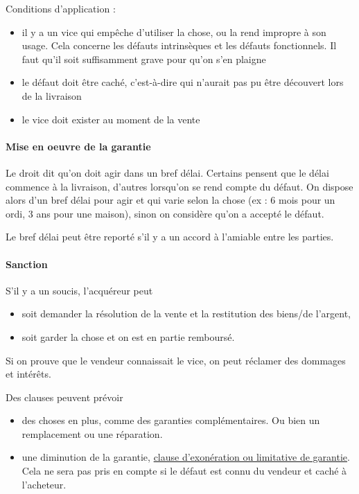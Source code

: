 		Conditions d'application :
		
		\begin{itemize}
			\item il y a un vice qui empêche d'utiliser la chose, ou la rend impropre à son usage. Cela concerne les défauts intrinsèques et les défauts fonctionnels. Il faut qu'il soit suffisamment grave pour qu'on s'en plaigne
			\item le défaut doit être caché, c'est-à-dire qui n'aurait pas pu être découvert lors de la livraison
			\item le vice doit exister au moment de la vente
		\end{itemize}
		
		
			\paragraph{Mise en oeuvre de la garantie}
		
			
			Le droit dit qu'on doit agir dans un bref délai. Certains pensent que le délai commence à la livraison, d'autres lorsqu'on se rend compte du défaut. On dispose alors d'un bref délai pour agir et qui varie selon la chose (ex : 6 mois pour un ordi, 3 ans pour une maison), sinon on considère qu'on a accepté le défaut.
		
			Le bref délai peut être reporté s'il y a un accord à l'amiable entre les parties.
		
			\paragraph{Sanction}
			S'il y a un soucis, l'acquéreur peut
			
			\begin{itemize}
				\item soit demander la résolution de la vente et la restitution des biens/de l'argent,
				\item soit garder la chose et on est en partie remboursé.
			\end{itemize}
			
			Si on prouve que le vendeur connaissait le vice, on peut réclamer des dommages et intérêts.
			
			Des clauses peuvent prévoir
		
			\begin{itemize}
				\item des choses en plus, comme des garanties complémentaires. Ou bien un remplacement ou une réparation.
				\item une diminution de la garantie, \underline{clause d'exonération ou limitative de garantie}. Cela ne sera pas pris en compte si le défaut est connu du vendeur et caché à l'acheteur.
			\end{itemize}
		
